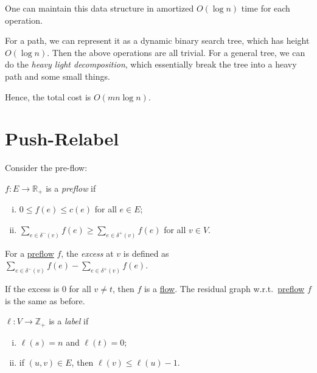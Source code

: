 One can maintain this data structure in amortized \(O(\log n)\) time for each operation.

\begin{intuition}
	For a path, we can represent it as a dynamic binary search tree, which has height \(O(\log n)\). Then the above operations are all trivial. For a general tree, we can do the \emph{heavy light decomposition}, which essentially break the tree into a heavy path and some small things.
\end{intuition}

Hence, the total cost is \(O(m n \log n)\).

\section{Push-Relabel}
Consider the pre-flow:

\begin{definition}[Preflow]\label{def:preflow}
	\(f \colon E \to \mathbb{R} _{+}\) is a \emph{preflow} if
	\begin{enumerate}[(i)]
		\item \(0 \leq f(e) \leq c(e)\) for all \(e \in E\);
		\item \(\sum_{e \in \delta ^-(v)} f(e) \geq \sum_{e \in \delta ^+(v)}f(e) \) for all \(v \in V\).
	\end{enumerate}
\end{definition}

\begin{notation}
	For a \hyperref[def:preflow]{preflow} \(f\), the \emph{excess} at \(v\) is defined as \(\sum_{e \in \delta ^-(v)} f(e) - \sum_{e \in \delta ^+(v)} f(e)\).
\end{notation}

If the excess is \(0\) for all \(v \neq t\), then \(f\) is a \hyperref[def:flow]{flow}. The residual graph w.r.t.\ \hyperref[def:preflow]{preflow} \(f\) is the same as before.

\begin{definition}[Label]
	\(\ell \colon V \to \mathbb{Z} _{+}\) is a \emph{label} if
	\begin{enumerate}[(i)]
		\item \(\ell (s) = n\) and \(\ell (t) = 0\);
		\item if \((u, v) \in E\), then \(\ell (v) \leq \ell (u) - 1\).
	\end{enumerate}
\end{definition}